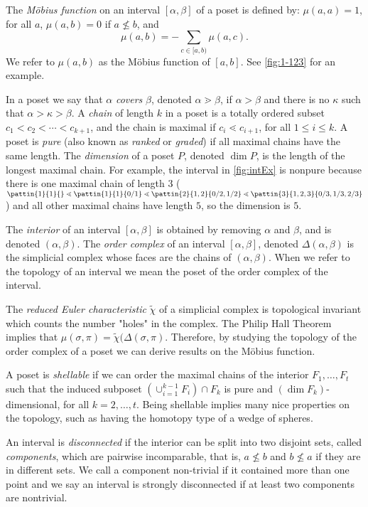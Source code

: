 \documentclass[11pt,a4paper,oneside]{article}
\begin{document}
The \emph{M\"obius function} on an interval $[\alpha,\beta]$ of a poset is defined by:
$\mu(a,a)=1$, for all $a$, $\mu(a,b)=0$ if $a\not\le b$, and $$\mu(a,b)=-\sum_{c\in[a,b)}\mu(a,c).$$
We refer to $\mu(a,b)$ as the M\"obius function of $[a,b]$. See \cref{fig:1-123} for an example.

In a poset we say that $\alpha$ \emph{covers} $\beta$, denoted $\alpha\gtrdot\beta$, if $\alpha>\beta$
and there is no $\kappa$ such that $\alpha>\kappa>\beta$. A \emph{chain} of length $k$ in a poset is 
a totally ordered subset $c_1<c_2<\cdots<c_{k+1}$, and the chain is maximal if $c_i\lessdot c_{i+1}$,
for all $1\le i \le k$. A poset is \emph{pure} (also known as \emph{ranked} or \emph{graded}) if all
maximal chains have the same length. The \emph{dimension} of a poset $P$, denoted $\dim P$, is the 
length of the longest maximal chain. For example, the interval in \cref{fig:intEx} is nonpure because
there is one maximal chain of length $3$ ($\pattin{1}{1}{}\lessdot\pattin{1}{1}{0/1}\lessdot
\pattin{2}{1,2}{0/2,1/2}\lessdot\pattin{3}{1,2,3}{0/3,1/3,2/3}$) and all other maximal chains have 
length $5$, so the dimension is $5$.

The \emph{interior} of an interval $[\alpha,\beta]$ is obtained by removing $\alpha$ and $\beta$, 
and is denoted $(\alpha,\beta)$. The \emph{order complex} of an interval $[\alpha,\beta]$, denoted 
$\Delta(\alpha,\beta)$ is the simplicial complex whose faces are the chains of $(\alpha,\beta)$. 
When we refer to the topology of an interval we mean the poset of the order complex of the interval. 

The \emph{reduced Euler characteristic} $\tilde{\chi}$ of a simplicial complex is topological invariant 
which counts the number "holes" in the complex. The Philip Hall Theorem implies that 
$\mu(\sigma,\pi)=\tilde{\chi}(\Delta(\sigma,\pi)$. Therefore, by studying the topology of the order 
complex of a poset we can derive results on the M\"obius function.

A poset is \emph{shellable} if we can order the maximal chains of the interior $F_1,\ldots,F_t$ 
such that the induced subposet $\left(\cup_{i=1}^{k-1}F_i\right)\cap F_k$ is pure and 
$(\dim F_k)$-dimensional, for all $k=2,\ldots,t$. Being shellable implies many nice properties 
on the topology, such as having the homotopy type of a wedge of spheres.

An interval is \emph{disconnected} if the interior can be split into two disjoint sets, called 
\emph{components}, which are pairwise incomparable, that is, $a\not\le b$ and $b\not\le a$ if 
they are in different sets. We call a component non-trivial if it contained more than one point 
and we say an interval is strongly disconnected if at least two components are nontrivial.
\end{document}
